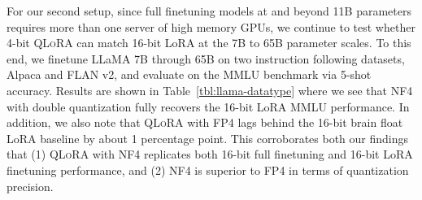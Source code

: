 For our second setup, since full finetuning models at and beyond 11B parameters requires more than one server of high memory GPUs, we continue to test whether 4-bit \textsc{QLoRA} can match 16-bit LoRA at the 7B to 65B parameter scales. To this end, we finetune LLaMA 7B through 65B on two instruction following datasets, Alpaca and FLAN v2, and evaluate on the MMLU benchmark via 5-shot accuracy. Results are shown in Table~\ref{tbl:llama-datatype} where we see that NF4 with double quantization fully recovers the 16-bit LoRA MMLU performance. In addition, we also note that \textsc{QLoRA} with FP4 lags behind the 16-bit brain float LoRA baseline by about 1 percentage point. This corroborates both our findings that (1) \textsc{QLoRA} with NF4 replicates both 16-bit full finetuning and 16-bit LoRA finetuning performance, and (2) NF4 is superior to FP4 in terms of quantization precision.

\begin{table}[]
    \centering
    \caption{Experiments comparing 16-bit BrainFloat (BF16), 8-bit Integer (Int8), 4-bit Float (FP4), and 4-bit NormalFloat (NF4) on GLUE and Super-NaturalInstructions. \textsc{QLoRA} replicates 16-bit LoRA and full-finetuning.}

    \label{tab:nf4vsbf16}
\end{table}

